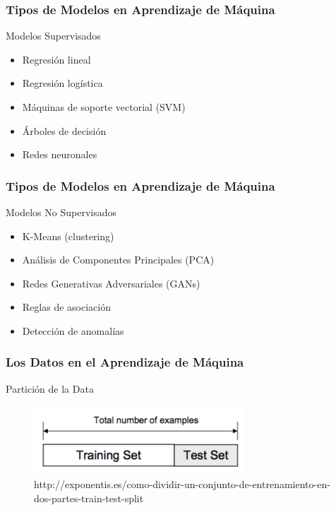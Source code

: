 \documentclass{beamer}
\begin{document}
\begin{frame}
	\frametitle{Tipos de Modelos en Aprendizaje de Máquina}
	
	\begin{block}{Modelos Supervisados}
	\begin{itemize}
		\item Regresión lineal
		\item Regresión logística
		\item Máquinas de soporte vectorial (SVM)
		\item Árboles de decisión
		\item Redes neuronales
	\end{itemize}
\end{block}

\end{frame}

	
	\begin{frame}
		\frametitle{Tipos de Modelos en Aprendizaje de Máquina}
			\begin{block}{Modelos No Supervisados}
		\begin{itemize}
			\item K-Means (clustering)
			\item Análisis de Componentes Principales (PCA)
			\item Redes Generativas Adversariales (GANs)
			\item Reglas de asociación
			\item Detección de anomalías
		\end{itemize}
	\end{block}
		\end{frame}
	
	\begin{frame}
		\frametitle{Los Datos en el Aprendizaje de Máquina}
		\begin{block}{Partición de la Data}	
			\begin{figure}
				\includegraphics[width=0.7\textwidth]{entrenamiento_prueba}
				\caption{http://exponentis.es/como-dividir-un-conjunto-de-entrenamiento-en-dos-partes-train-test-split}
			\end{figure}
		\end{block}
	\end{frame}
	
\end{document}
